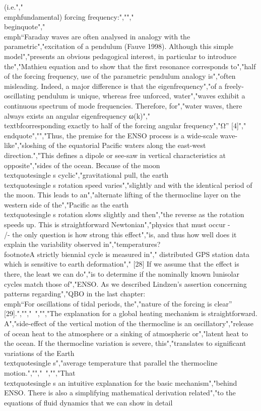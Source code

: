 {{{{{{{{{{(i.e.","\\emph{fundamental}) forcing frequency:","","\\begin{quote}","\\emph{``Faraday waves are often analysed in analogy with the parametric","excitation of a pendulum (Fauve 1998). Although this simple model","presents an obvious pedagogical interest, in particular to introduce the","Mathieu equation and to show that the first resonance corresponds to","half of the forcing frequency, use of the parametric pendulum analogy is","often misleading. Indeed, a major difference is that the eigenfrequency","of a freely-oscillating pendulum is unique, whereas free unforced, water","waves exhibit a continuous spectrum of mode frequencies. Therefore, for","water waves, there always exists an angular eigenfrequency ω(k)","\\textbf{corresponding exactly to half of the forcing angular frequency","Ω}''} {[}4{]}","\\end{quote}","","Thus, the premise for the ENSO process is a wide-scale wave-like","sloshing of the equatorial Pacific waters along the east-west direction.","This defines a dipole or see-saw in vertical characteristics at opposite","sides of the ocean. Because of the moon\\textquotesingle s cyclic","gravitational pull, the earth\\textquotesingle s rotation speed varies","slightly and with the identical period of the moon. This leads to an","alternate lifting of the thermocline layer on the western side of the","Pacific as the earth\\textquotesingle s rotation slows slightly and then","the reverse as the rotation speeds up. This is straightforward Newtonian","physics that must occur -\\/- the only question is how strong this effect","is, and thus how well does it explain the variability observed in","temperatures?\\footnote{A strictly biennial cycle is measured in","  distributed GPS station data which is sensitive to earth deformation","  {[}28{]}} If we assume that the effect is there, the least we can do","is to determine if the nominally known lunisolar cycles match those of","ENSO. As we described Lindzen's assertion concerning patterns regarding","QBO in the last chapter: \\emph{``For oscillations of tidal periods, the","nature of the forcing is clear''} {[}29{]}.","","~","","The explanation for a global heating mechanism is straightforward. A","side-effect of the vertical motion of the thermocline is an oscillatory","release of ocean heat to the atmosphere or a sinking of atmospheric or","latent heat to the ocean. If the thermocline variation is severe, this","translates to significant variations of the Earth\\textquotesingle s","average temperature that parallel the thermocline motion.","","~","","That\\textquotesingle s an intuitive explanation for the basic mechanism","behind ENSO. There is also a simplifying mathematical derivation related","to the equations of fluid dynamics that we can show in detail }}}}}}}}}}
